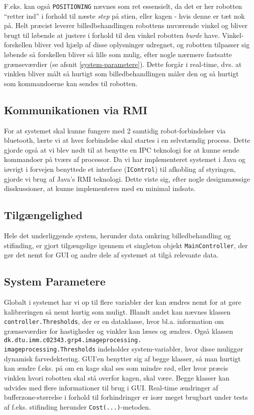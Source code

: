 F.eks. kan også \texttt{POSITIONING} nævnes som ret essensielt, da det er her robotten “retter ind” i forhold til næste \textit{step} på stien, eller kagen - hvis denne er tæt nok på. Helt præcist leverer billedbehandlingen robottens nuværende vinkel og bliver brugt til løbende at justere i forhold til den vinkel robotten \textit{burde} have. Vinkel-forskellen bliver ved hjælp af disse oplysninger udregnet, og robotten tilpasser sig løbende så forskellen bliver så lille som mulig, efter nogle nærmere fastsatte grænseværdier (se afsnit  \vref{system-parametere}). Dette forgår i real-time, dvs. at vinklen bliver målt så hurtigt som billedbehandlingen måler den og så hurtigt som kommandoerne kan sendes til robotten.

\subsection{Kommunikationen via RMI}
For at systemet skal kunne fungere med 2 samtidig robot-forbindelser via bluetooth, lærte vi at hver forbindelse skal startes i en selvstændig process. Dette gjorde også at vi blev nødt til at benytte en IPC teknologi for at kunne sende kommandoer på tværs af processor.
Da vi har implementeret systemet i Java og iøvrigt i forvejen benyttede et interface (\texttt{IControl}) til afkobling af styringen, gjorde vi brug af Java’s RMI teknologi. Dette viste sig, efter nogle designmæssige disskussioner, at kunne implementeres med en minimal indsats.

\subsection{Tilgængelighed}
Hele det underliggende system, herunder data omkring billedbehandling og stifinding, er gjort tilgængelige igennem et singleton objekt \texttt{MainController}, der gør det nemt for GUI og andre dele af systemet at tilgå relevante data.

\subsection{System Parametere}\label{system-parametere}
Globalt i systemet har vi op til flere variabler der kan ændres nemt for at gøre kalibreringen så nemt hurtig som muligt. Blandt andet kan nævnes klassen \texttt{controller.Thresholds}, der er en dataklasse, hvor bl.a. information om grænseværdier for hastigheder og vinkler kan læses og ændres. Også klassen \texttt{dk.dtu.imm.c02343.grp4.imageprocessing.\\imageprocessing.Thresholds} indeholder system-variabler, hvor disse muliggør dynamisk farvedektering. GUI’en benytter sig af begge klasser, så man hurtigt kan ændre f.eks. på om en kage skal ses som mindre rød, eller hvor præcis vinklen hvori robotten skal stå overfor kagen, skal være. Begge klasser kan udvides med flere informationer til brug i GUI. Real-time ændringer af bufferzone-størrelse i forhold til forhindringer er især meget brugbart under tests af f.eks. stifinding herunder \texttt{Cost(...)}-metoden.

